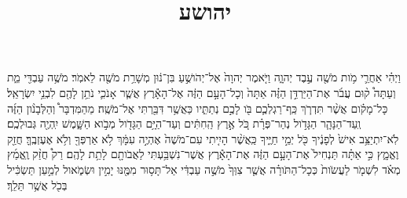 \documentclass{openreader}
\title{יהושע}
\date{}
\begin{document}
\maketitle
\raggedbottom 
\fontsize{16pt}{24pt}\selectfont


וַיְהִ֗י אַחֲרֵ֛י מֹ֥ות מֹשֶׁ֖ה עֶ֣בֶד יְהוָ֑ה וַיֹּ֤אמֶר יְהוָה֙ אֶל־יְהֹושֻׁ֣עַ בִּן־נ֔וּן מְשָׁרֵ֥ת מֹשֶׁ֖ה לֵאמֹֽר׃ 
מֹשֶׁ֥ה עַבְדִּ֖י מֵ֑ת וְעַתָּה֩ ק֨וּם עֲבֹ֜ר אֶת־הַיַּרְדֵּ֣ן הַזֶּ֗ה אַתָּה֙ וְכָל־הָעָ֣ם הַזֶּ֔ה אֶל־הָאָ֕רֶץ אֲשֶׁ֧ר אָנֹכִ֛י נֹתֵ֥ן לָהֶ֖ם לִבְנֵ֥י יִשְׂרָאֵֽל׃ 
כָּל־מָקֹ֗ום אֲשֶׁ֨ר תִּדְרֹ֧ךְ כַּֽף־רַגְלְכֶ֛ם בֹּ֖ו לָכֶ֣ם נְתַתִּ֑יו כַּאֲשֶׁ֥ר דִּבַּ֖רְתִּי אֶל־מֹשֶֽׁה׃ 
מֵהַמִּדְבָּר֩ וְהַלְּבָנֹ֨ון הַזֶּ֜ה וְֽעַד־הַנָּהָ֧ר הַגָּדֹ֣ול נְהַר־פְּרָ֗ת כֹּ֚ל אֶ֣רֶץ הַֽחִתִּ֔ים וְעַד־הַיָּ֥ם הַגָּדֹ֖ול מְבֹ֣וא הַשָּׁ֑מֶשׁ יִֽהְיֶ֖ה גְּבוּלְכֶֽם׃ 
לֹֽא־יִתְיַצֵּ֥ב אִישׁ֙ לְפָנֶ֔יךָ כֹּ֖ל יְמֵ֣י חַיֶּ֑יךָ כַּֽאֲשֶׁ֨ר הָיִ֤יתִי עִם־מֹשֶׁה֙ אֶהְיֶ֣ה עִמָּ֔ךְ לֹ֥א אַרְפְּךָ֖ וְלֹ֥א אֶעֶזְבֶֽךָּ׃ 
חֲזַ֖ק וֶאֱמָ֑ץ כִּ֣י אַתָּ֗ה תַּנְחִיל֙ אֶת־הָעָ֣ם הַזֶּ֔ה אֶת־הָאָ֕רֶץ אֲשֶׁר־נִשְׁבַּ֥עְתִּי לַאֲבֹותָ֖ם לָתֵ֥ת לָהֶֽם׃ 
רַק֩ חֲזַ֨ק וֶֽאֱמַ֜ץ מְאֹ֗ד לִשְׁמֹ֤ר לַעֲשֹׂות֙ כְּכָל־הַתֹּורָ֗ה אֲשֶׁ֤ר צִוְּךָ֙ מֹשֶׁ֣ה עַבְדִּ֔י אַל־תָּס֥וּר מִמֶּ֖נּוּ יָמִ֣ין וּשְׂמֹ֑אול לְמַ֣עַן תַּשְׂכִּ֔יל בְּכֹ֖ל אֲשֶׁ֥ר תֵּלֵֽךְ׃ 
\end{document}
